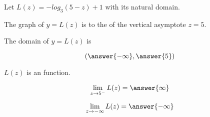 \documentclass{ximera}
\author{Lee Wayand}
\begin{document}
\begin{exercise}






Let $L(z) = -log_3(5-z) + 1$ with its natural domain. \\





\begin{question}


The graph of $y = L(z)$ is to the  of the vertical asymptote $z = 5$.


\end{question}





\begin{question}


The domain of $y = L(z)$ is 

\[
\left( \answer{-\infty}, \answer{5} \right)
\]


\end{question}






\begin{question}


$L(z)$ is an  function.


\end{question}











\begin{question}


\[
\lim\limits_{z \to 5^-} L(z) = \answer{\infty}
\]


\end{question}








\begin{question}


\[
\lim\limits_{z \to -\infty} L(z) = \answer{-\infty}
\]


\end{question}










\end{exercise}
\end{document}
